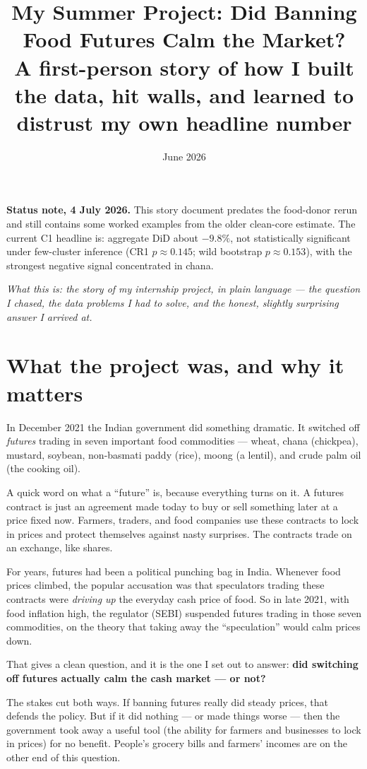 \documentclass[11pt]{article}
\title{\textbf{My Summer Project: Did Banning Food Futures Calm the Market?}\\[6pt]
\large A first-person story of how I built the data, hit walls, and learned to distrust my own headline number}
\author{}
\date{June 2026}
\begin{document}
\maketitle

\noindent\textbf{Status note, 4 July 2026.} This story document predates the
food-donor rerun and still contains some worked examples from the older clean-core
estimate. The current C1 headline is: aggregate DiD about $-9.8\%$, not statistically
significant under few-cluster inference (CR1 $p \approx 0.145$; wild bootstrap
$p \approx 0.153$), with the strongest negative signal concentrated in chana.

\bigskip

\noindent\textit{What this is: the story of my internship project, in plain language --- the question I chased, the data problems I had to solve, and the honest, slightly surprising answer I arrived at.}

\bigskip

\section*{What the project was, and why it matters}

In December 2021 the Indian government did something dramatic. It switched off \emph{futures} trading in seven important food commodities --- wheat, chana (chickpea), mustard, soybean, non-basmati paddy (rice), moong (a lentil), and crude palm oil (the cooking oil).

A quick word on what a ``future'' is, because everything turns on it. A futures contract is just an agreement made today to buy or sell something later at a price fixed now. Farmers, traders, and food companies use these contracts to lock in prices and protect themselves against nasty surprises. The contracts trade on an exchange, like shares.

For years, futures had been a political punching bag in India. Whenever food prices climbed, the popular accusation was that speculators trading these contracts were \emph{driving up} the everyday cash price of food. So in late 2021, with food inflation high, the regulator (SEBI) suspended futures trading in those seven commodities, on the theory that taking away the ``speculation'' would calm prices down.

That gives a clean question, and it is the one I set out to answer: \textbf{did switching off futures actually calm the cash market --- or not?}

The stakes cut both ways. If banning futures really did steady prices, that defends the policy. But if it did nothing --- or made things worse --- then the government took away a useful tool (the ability for farmers and businesses to lock in prices) for no benefit. People's grocery bills and farmers' incomes are on the other end of this question.
\end{document}
